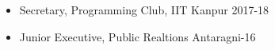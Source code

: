 
{\fontsize{11pt}{1em}\bodyfontlight\upshape\color{text}
  \begin{itemize}
  \item Secretary, Programming Club, IIT Kanpur 2017-18
  \item Junior Executive, Public Realtions Antaragni-16 
  \end{itemize}
}
